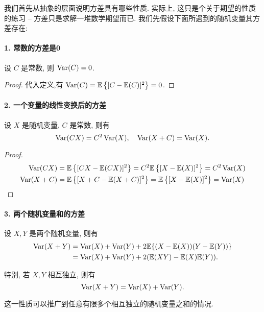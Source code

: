    我们首先从抽象的层面说明方差具有哪些性质. 实际上, 这只是个关于期望的性质的练习 -- 方差只是求解一堆数学期望而已. 我们先假设下面所遇到的随机变量其方差存在: 

   \paragraph{1. 常数的方差是0} 设 $C$ 是常数, 则 $\operatorname{Var}(C)=0$.
   \begin{proof}
    代入定义,有 $\operatorname{Var}(C)=\mathbb E\left\{[C-\mathbb E(C)]^2\right\}=0$.
   \end{proof}


   \paragraph{2. 一个变量的线性变换后的方差} 设 $X$ 是随机变量, $C$ 是常数, 则有
   $$
   \operatorname{Var}(C X)=C^2 \operatorname{Var}(X), \quad \operatorname{Var}(X+C)=\operatorname{Var}(X) .
   $$

   \begin{proof}
    
    $$
\begin{aligned}
\operatorname{Var}(C X) & =\mathbb E\left\{[C X-\mathbb E(C X)]^2\right\}=C^2 \mathbb E\left\{[X-\mathbb E(X)]^2\right\}=C^2 \operatorname{Var}(X) \\
\operatorname{Var}(X+C) & =\mathbb E\left\{[X+C-\mathbb E(X+C)]^2\right\}=\mathbb E\left\{[X-\mathbb E(X)]^2\right\}=\operatorname{Var}(X)
\end{aligned}
$$
   \end{proof}

   \paragraph{3. 两个随机变量和的方差} 设 $X, Y$ 是两个随机变量, 则有
   $$
   \begin{aligned}
    \operatorname{Var}(X+Y)&=\operatorname{Var}(X)+\operatorname{Var}(Y)+2 \mathbb E\{(X-\mathbb E(X))(Y-\mathbb E(Y))\} \\
    &=\operatorname{Var}(X)+\operatorname{Var}(Y)+2(\mathbb E(XY) -\mathbb E(X)\mathbb E(Y)) .
   \end{aligned}
   $$
   
   特别, 若 $X, Y$ 相互独立, 则有
   $$
   \operatorname{Var}(X+Y)=\operatorname{Var}(X)+\operatorname{Var}(Y) .
   $$
   
   这一性质可以推广到任意有限多个相互独立的随机变量之和的情况.


